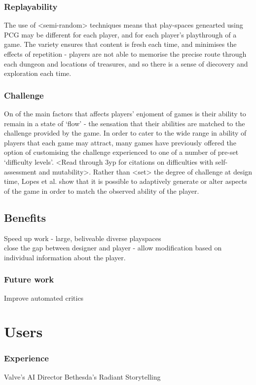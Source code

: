 \documentclass{./acm_proc_article-sp}
\begin{document}
\subsubsection{Replayability}
The use of <semi-random> techniques means that play-spaces genearted using PCG may be different for each player, and for each player's playthrough of a game. The variety ensures that content is fresh each time, and minimises the effects of repetition - players are not able to memorise the precise route through each dungeon and locations of treasures, and so there is a sense of diecovery and exploration each time.

\subsubsection{Challenge}
On of the main factors that affects players' enjoment of games is their ability to remain in a state of `flow' - the sensation that their abilities are matched to the challenge provided by the game\cite{flow}.
In order to cater to the wide range in ability of players that each game may attract, many games have previously offered the option of customising the challenge experienced to one of a number of pre-set `difficulty levels'. <Read through 3yp for citations on difficulties with self-assessment and mutability>. Rather than <set> the degree of challenge at design time, Lopes et al. show that it is possible to adaptively generate or alter aspects of the game\cite{lopes2011adaptivity} in order to match the observed ability of the player\cite{ResE5}.

\subsection{Benefits}
Speed up work - large, beliveable diverse playspaces\\
close the gap between designer and player - allow modification based on individual information about the player.
\subsubsection{Future work}
Improve automated critics \cite{hendrikx2012procedural}

\section{Users}

\subsubsection{Experience}
Valve's AI Director
Bethesda's Radiant Storytelling
\end{document}
